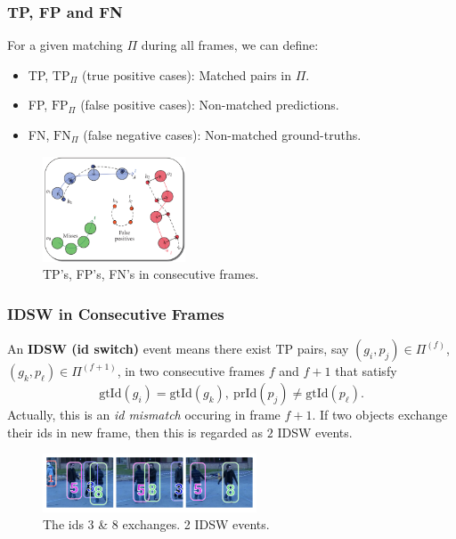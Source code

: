 \documentclass[slidetop, mathserif]{beamer}
\begin{document}
\begin{frame}
	\frametitle{TP, FP and FN}
	
	For a given matching $\Pi$ during all frames, we can define:
	\begin{itemize} \itemsep = 2pt
		\item TP, $\text{TP}_\Pi$ (true positive cases): Matched pairs in $\Pi$.
		\item FP, $\text{FP}_\Pi$ (false positive cases): Non-matched predictions.
		\item FN, $\text{FN}_\Pi$ (false negative cases): Non-matched ground-truths.
	\end{itemize}
	
	\begin{figure}
		\includegraphics[width=120pt]{pics/fig2.png}
		\caption{TP's, FP's, FN's in consecutive frames.}
	\end{figure}
	
\end{frame}

\begin{frame}
	\frametitle{IDSW in Consecutive Frames}
	
	An {\bf IDSW (id switch)} event means there exist TP pairs, say $(g_i, p_j)\in\Pi^{(f)}$,
	$(g_k, p_\ell)\in\Pi^{(f+1)}$, in two consecutive frames
	$f$ and $f+1$ that satisfy
	\[
		\text{gtId}(g_i) = \text{gtId}(g_k),\ 
		\text{prId}(p_j) \neq \text{gtId}(p_\ell).
	\]
	Actually, this is an \emph{id mismatch} occuring in frame $f+1$.
	If two objects exchange their ids in new frame, then this is regarded as $2$
	IDSW events.
	\begin{figure}
		\includegraphics[width=180pt]{pics/fig3.png}
		\caption{The ids 3 \& 8 exchanges. 2 IDSW events.}
	\end{figure}
	    
	    
\end{frame}
\end{document}
